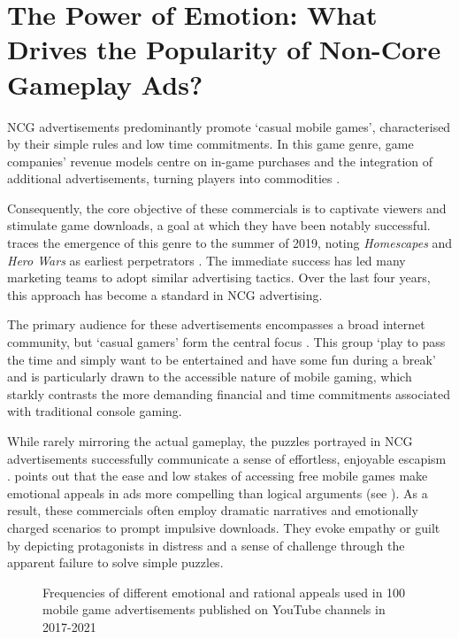 \documentclass[a4paper, 12pt, mla]{homework}
\begin{document}
\section*{The Power of Emotion: What Drives the Popularity of Non-Core Gameplay Ads?} 
NCG advertisements predominantly promote `casual mobile games', characterised by their simple rules and low time commitments. 
In this game genre, game companies' revenue models centre on in-game purchases and the integration of additional advertisements, turning players into commodities \cite{BK:Nieborg2017}.

Consequently, the core objective of these commercials is to captivate viewers and stimulate game downloads, a goal at which they have been notably successful. 
 traces the emergence of this genre to the summer of 2019, noting \textit{Homescapes} and \textit{Hero Wars} as earliest perpetrators \cite{DG:Homescapes, DG:HeroWars}. 
The immediate success has led many marketing teams to adopt similar advertising tactics. Over the last four years, this approach has become a standard in NCG advertising.

The primary audience for these advertisements encompasses a broad internet community, but `casual gamers' form the central focus \cite{WB:Knezovic2023}. 
This group `play to pass the time and simply want to be entertained and have some fun during a break' and is particularly drawn to the accessible nature of mobile gaming, which starkly contrasts the more demanding financial and time commitments associated with traditional console gaming.

While rarely mirroring the actual gameplay, the puzzles portrayed in NCG advertisements successfully communicate a sense of effortless, enjoyable escapism \cite{WB:Knezovic2023}. 
 points out that the ease and low stakes of accessing free mobile games make emotional appeals in ads more compelling than logical arguments (see ). 
As a result, these commercials often employ dramatic narratives and emotionally charged scenarios to prompt impulsive downloads. 
They evoke empathy or guilt by depicting protagonists in distress and a sense of challenge through the apparent failure to solve simple puzzles.

\begin{figure}[htb]\centering
	
	\caption{Frequencies of different \textcolor{\colourE}{emotional} and \textcolor{\colourR}{rational} appeals used in 100 mobile game advertisements published on YouTube channels
	in 2017-2021 \protect\cite{RA:Ihsan2022}}
	\label{FIG:EmotionalAppeals}
\end{figure}
\end{document}
